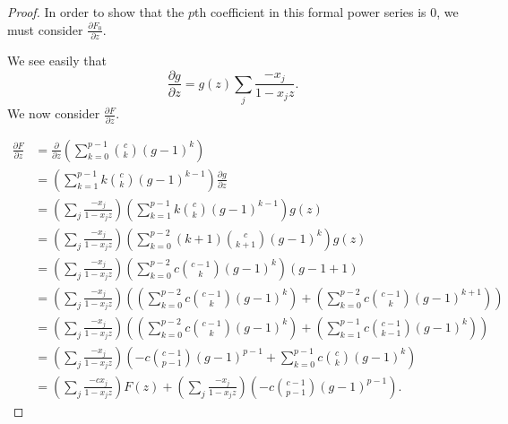 \documentclass{article}
\numberwithin{equation}{section}
\begin{document}
\begin{proof}
In order to show that the $p$th coefficient in this formal power series is $0$, we must consider $\frac{\partial F_0}{\partial z}$. 

We see easily that $$\frac{\partial g}{\partial z} = g(z) \sum_j \frac{-x_j}{1-x_jz}.$$ We now consider $\frac{\partial F}{\partial z}$.

\begin{align*}
\frac{\partial F}{\partial z}&=\frac{\partial}{\partial z}\left(\sum_{k=0}^{p-1} \binom{c}{k} (g-1)^k\right)\\
&=\left(\sum_{k=1}^{p-1}k\binom{c}{k}(g-1)^{k-1}\right)\frac{\partial g}{\partial z}\\
&=\left(\sum_j \frac{-x_j}{1-x_jz}\right)\left(\sum_{k=1}^{p-1}k\binom{c}{k}(g-1)^{k-1}\right)g(z)\\
&=\left(\sum_j \frac{-x_j}{1-x_jz}\right)\left(\sum_{k=0}^{p-2}(k+1)\binom{c}{k+1}(g-1)^{k}\right)g(z)\\
&=\left(\sum_j \frac{-x_j}{1-x_jz}\right)\left(\sum_{k=0}^{p-2}c\binom{c-1}{k}(g-1)^{k}\right)(g-1+1)\\
&=\left(\sum_j \frac{-x_j}{1-x_jz}\right)\left(\left(\sum_{k=0}^{p-2}c\binom{c-1}{k}(g-1)^{k}\right)+\left(\sum_{k=0}^{p-2}c\binom{c-1}{k}(g-1)^{k+1}\right)\right)\\
&=\left(\sum_j \frac{-x_j}{1-x_jz}\right)\left(\left(\sum_{k=0}^{p-2}c\binom{c-1}{k}(g-1)^{k}\right)+\left(\sum_{k=1}^{p-1}c\binom{c-1}{k-1}(g-1)^{k}\right)\right)\\
&=\left(\sum_j \frac{-x_j}{1-x_jz}\right)\left(-c\binom{c-1}{p-1}(g-1)^{p-1}+\sum_{k=0}^{p-1}c\binom{c}{k}(g-1)^{k}\right)\\
&=\left(\sum_j \frac{-cx_j}{1-x_jz}\right)F(z)+\left(\sum_j \frac{-x_j}{1-x_jz}\right)\left(-c\binom{c-1}{p-1}(g-1)^{p-1}\right).
\end{align*}


\end{proof}
\end{document}

